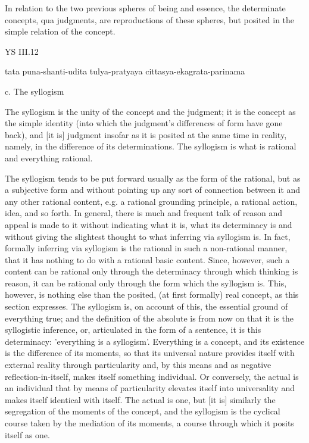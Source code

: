 In relation to the two previous spheres of being and essence,
the determinate concepts, qua judgments,
are reproductions of these spheres,
but posited in the simple relation of the concept.

YS III.12

tata puna-shanti-udita tulya-pratyaya cittasya-ekagrata-parinama

c. The syllogism

The syllogism is the unity of the concept and the judgment;
it is the concept as the simple identity
(into which the judgment's differences of form have gone back),
and [it is] judgment insofar as it is posited
at the same time in reality,
namely, in the difference of its determinations.
The syllogism is what is rational
and everything rational.

The syllogism tends to be put forward usually
as the form of the rational,
but as a subjective form and without pointing up
any sort of connection between it
and any other rational content, e.g.
a rational grounding principle, a rational action, idea, and so forth.
In general, there is much and frequent talk of reason
and appeal is made to it without indicating what it is,
what its determinacy is and without giving the slightest thought
to what inferring via syllogism is.
In fact, formally inferring via syllogism is
the rational in such a non-rational manner,
that it has nothing to do with a rational basic content.
Since, however, such a content can be rational
only through the determinacy through which thinking is reason,
it can be rational only through the form which the syllogism is.
This, however, is nothing else than
the posited, (at first formally) real concept,
as this section expresses.
The syllogism is, on account of this,
the essential ground of everything true;
and the definition of the absolute is from now on
that it is the syllogistic inference,
or, articulated in the form of a sentence,
it is this determinacy:
'everything is a syllogism'.
Everything is a concept,
and its existence is the difference of its moments,
so that its universal nature provides itself
with external reality through particularity
and, by this means and as negative reflection-in-itself,
makes itself something individual.
Or conversely, the actual is an individual
that by means of particularity
elevates itself into universality
and makes itself identical with itself.
The actual is one, but [it is] similarly
the segregation of the moments of the concept,
and the syllogism is the cyclical course
taken by the mediation of its moments,
a course through which it posits itself as one.

